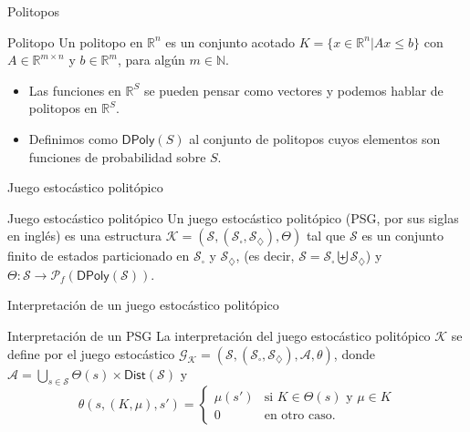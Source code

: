 \documentclass{beamer}
\newcommand{\St}{\mathcal{S}}
\newcommand{\Act}{\mathcal{A}}
\newcommand{\diam}{\diamondsuit}
\newcommand{\cuad}{\square}
\newcommand{\K}{\mathcal{K}}
\newcommand{\Gk}{\mathcal{G}_\mathcal{K}}
\newcommand{\DPoly}{\textsf{DPoly}}
\begin{document}
\begin{frame}{Politopos}
	\begin{block}{Politopo}
		Un politopo en $\mathbb{R}^n$ es un conjunto acotado $K = \{ x
			\in \mathbb{R}^n | Ax \leq b\}$ con $A \in \mathbb{R}^{m\times n}$ y $ b \in
			\mathbb{R}^m$, para alg\'un $m \in \mathbb{N}$.
	\end{block}
	\pause

	\begin{itemize}
		\item Las funciones en $\mathbb{R}^S$ se pueden pensar como vectores y podemos hablar
		      de politopos en $\mathbb{R}^S$. \pause
		\item  Definimos como \( \DPoly(S) \) al conjunto de politopos cuyos elementos son
		      funciones de probabilidad sobre $S$.
	\end{itemize}

\end{frame}

\begin{frame}{Juego estoc\'astico polit\'opico}
	\pause
	\begin{block}{Juego estoc\'astico polit\'opico}
		Un juego estoc\'astico polit\'opico (PSG, por sus siglas en ingl\'es) es una estructura \( \K = (\St, (\St_\square, \St_\diamondsuit), \Theta) \) tal que \( \St \) es un conjunto finito de estados particionado en $\St_\cuad$ y $\St_\diam$, (es decir, \( \St = \St_\square \biguplus \St_\diamondsuit \)) y \( \Theta : \St \to \mathcal{P}_f(\textsf{DPoly}(\St)) \).
	\end{block}
\end{frame}

\begin{frame}{Interpretaci\'on de un juego estoc\'astico polit\'opico}
	\pause
	\begin{block}{Interpretaci\'on de un PSG}
		La interpretaci\'on del juego estoc\'astico polit\'opico \( \K \) se define por el juego estoc\'astico \( \Gk = (\St, (\St_\square, \St_\diamondsuit), \Act, \theta) \), donde \( \Act = \bigcup_{s \in \St} \Theta(s) \times \textsf{Dist}(\St) \) y
		\[
			\theta(s, (K, \mu), s') =
			\begin{cases}
				\mu(s') & \text{si } K \in \Theta(s) \text{ y } \mu \in K \\
				0 & \text{en otro caso}.
			\end{cases}
		\]
	\end{block}
\end{frame}
\end{document}

